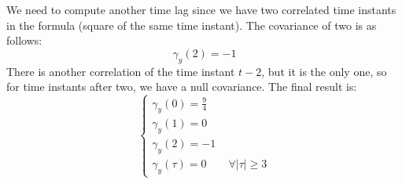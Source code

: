 \begin{enumerate}
        We need to compute another time lag since we have two correlated time instants in the formula (square of the same time instant). 
        The covariance of two is as follows:
        \[\gamma_y(2)=-1\]
        There is another correlation of the time instant $t-2$, but it is the only one, so for time instants after two, we have a null covariance.
        The final result is:
        \[\begin{cases}
            \gamma_y(0)=\frac{9}{4} \\
            \gamma_y(1)=0 \\
            \gamma_y(2)=-1 \\
            \gamma_y(\tau)=0 \qquad \forall\left\lvert \tau\right\rvert \geq 3
        \end{cases}\]
\end{enumerate}